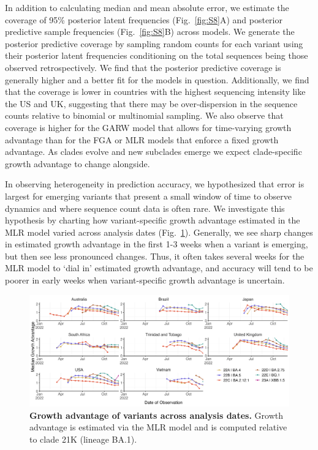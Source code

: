 In addition to calculating median and mean absolute error, we estimate the coverage of 95\% posterior latent frequencies (Fig.~\ref{fig:S8}A) and posterior predictive sample frequencies (Fig.~\ref{fig:S8}B) across models.
We generate the posterior predictive coverage by sampling random counts for each variant using their posterior latent frequencies conditioning on the total sequences being those observed retrospectively.
We find that the posterior predictive coverage is generally higher and a better fit for the models in question.
Additionally, we find that the coverage is lower in countries with the highest sequencing intensity like the US and UK, suggesting that there may be over-dispersion in the sequence counts relative to binomial or multinomial sampling.
We also observe that coverage is higher for the GARW model that allows for time-varying growth advantage than for the FGA or MLR models that enforce a fixed growth advantage.
As clades evolve and new subclades emerge we expect clade-specific growth advantage to change alongside.


In observing heterogeneity in prediction accuracy, we hypothesized that error is largest for emerging variants that present a small window of time to observe dynamics and where sequence count data is often rare.
We investigate this hypothesis by charting how variant-specific growth advantage estimated in the MLR model varied across analysis dates (Fig.~\ref{fig:Fig4}).
Generally, we see sharp changes in estimated growth advantage in the first 1-3 weeks when a variant is emerging, but then see less pronounced changes.
Thus, it often takes several weeks for the MLR model to `dial in' estimated growth advantage, and accuracy will tend to be poorer in early weeks when variant-specific growth advantage is uncertain.

\begin{figure}[tb!]
	\centering
    \includegraphics[width=1.0\textwidth]{figures/ga_estimates.png}
    \caption[\textbf{Growth advantage of variants across analysis dates.}]{
	\textbf{Growth advantage of variants across analysis dates.}
	Growth advantage is estimated via the MLR model and is computed relative to clade 21K (lineage BA.1).
	}
	\label{fig:Fig4}
\end{figure}





